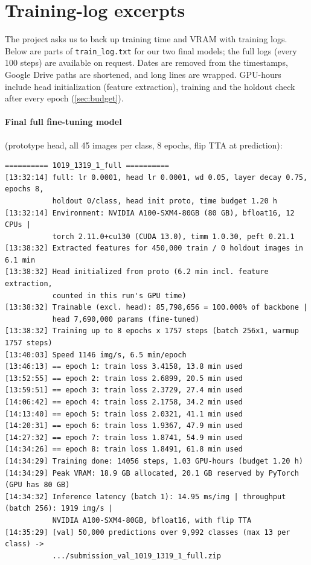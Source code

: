 \clearpage
\raggedbottom %
\appendix

\section{Training-log excerpts}
\label{sec:logs}

The project asks us to back up training time and VRAM with training logs.
Below are parts of \texttt{train\_log.txt} for our two final models; the full logs (every 100 steps) are available on request.
Dates are removed from the timestamps, Google Drive paths are shortened, and long lines are wrapped.
GPU-hours include head initialization (feature extraction), training and the holdout check after every epoch (\cref{sec:budget}).

\paragraph{Final full fine-tuning model} (prototype head, all 45 images per class, 8 epochs, flip TTA at prediction):
{\scriptsize
\begin{verbatim}
========== 1019_1319_1_full ==========
[13:32:14] full: lr 0.0001, head lr 0.0001, wd 0.05, layer decay 0.75, epochs 8,
           holdout 0/class, head init proto, time budget 1.20 h
[13:32:14] Environment: NVIDIA A100-SXM4-80GB (80 GB), bfloat16, 12 CPUs |
           torch 2.11.0+cu130 (CUDA 13.0), timm 1.0.30, peft 0.21.1
[13:38:32] Extracted features for 450,000 train / 0 holdout images in 6.1 min
[13:38:32] Head initialized from proto (6.2 min incl. feature extraction,
           counted in this run's GPU time)
[13:38:32] Trainable (excl. head): 85,798,656 = 100.000% of backbone |
           head 7,690,000 params (fine-tuned)
[13:38:32] Training up to 8 epochs x 1757 steps (batch 256x1, warmup 1757 steps)
[13:40:03] Speed 1146 img/s, 6.5 min/epoch
[13:46:13] == epoch 1: train loss 3.4158, 13.8 min used
[13:52:55] == epoch 2: train loss 2.6899, 20.5 min used
[13:59:51] == epoch 3: train loss 2.3729, 27.4 min used
[14:06:42] == epoch 4: train loss 2.1758, 34.2 min used
[14:13:40] == epoch 5: train loss 2.0321, 41.1 min used
[14:20:31] == epoch 6: train loss 1.9367, 47.9 min used
[14:27:32] == epoch 7: train loss 1.8741, 54.9 min used
[14:34:26] == epoch 8: train loss 1.8491, 61.8 min used
[14:34:29] Training done: 14056 steps, 1.03 GPU-hours (budget 1.20 h)
[14:34:29] Peak VRAM: 18.9 GB allocated, 20.1 GB reserved by PyTorch (GPU has 80 GB)
[14:34:32] Inference latency (batch 1): 14.95 ms/img | throughput (batch 256): 1919 img/s |
           NVIDIA A100-SXM4-80GB, bfloat16, with flip TTA
[14:35:29] [val] 50,000 predictions over 9,992 classes (max 13 per class) ->
           .../submission_val_1019_1319_1_full.zip
\end{verbatim}
}

